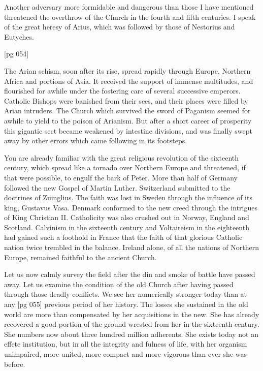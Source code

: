Another adversary more formidable and dangerous
than those I have mentioned threatened the
overthrow of the Church in the fourth and fifth
centuries. I speak of the great heresy of Arius,
which was followed by those of Nestorius and
Eutyches.

[pg 054]

The Arian schism, soon after its rise, spread
rapidly through Europe, Northern Africa and
portions of Asia. It received the support of immense
multitudes, and flourished for awhile under
the fostering care of several successive emperors.
Catholic Bishops were banished from
their sees, and their places were filled by Arian
intruders. The Church which survived the sword
of Paganism seemed for awhile to yield to the
poison of Arianism. But after a short career of
prosperity this gigantic sect became weakened by
intestine divisions, and was finally swept away
by other errors which came following in its footsteps.

You are already familiar with the great religious
revolution of the sixteenth century, which
spread like a tornado over Northern Europe and
threatened, if that were possible, to engulf the
bark of Peter. More than half of Germany followed
the new Gospel of Martin Luther. Switzerland
submitted to the doctrines of Zuinglius. The
faith was lost in Sweden through the influence of
its king, Gustavus Vasa. Denmark conformed to
the new creed through the intrigues of King
Christian II. Catholicity was also crushed out
in Norway, England and Scotland. Calvinism in
the sixteenth century and Voltaireism in the eighteenth
had gained such a foothold in France that
the faith of that glorious Catholic nation twice
trembled in the balance. Ireland alone, of all the
nations of Northern Europe, remained faithful to
the ancient Church.

Let us now calmly survey the field after the din
and smoke of battle have passed away. Let us
examine the condition of the old Church after
having passed through those deadly conflicts. We
see her numerically stronger today than at any
[pg 055]
previous period of her history. The losses she
sustained in the old world are more than compensated
by her acquisitions in the new. She has already
recovered a good portion of the ground
wrested from her in the sixteenth century. She
numbers now about three hundred million adherents.
She exists today not an effete institution,
but in all the integrity and fulness of life, with
her organism unimpaired, more united, more
compact and more vigorous than ever she was
before.

